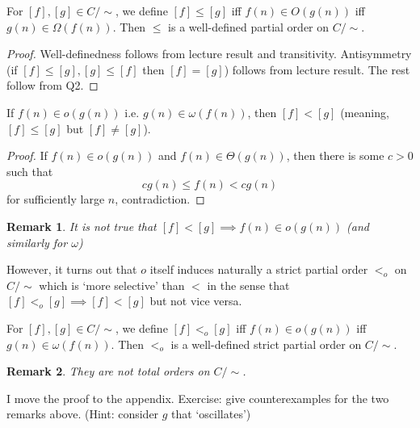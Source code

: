 \documentclass[t]{beamer}
\newtheorem{remark}{Remark}
\def\le{\leqslant}
\begin{document}
\begin{frame}
  \begin{theorem}
    For $[f], [g] \in C/{\sim}$, we define $[f] \le [g]$ iff $f(n) \in O(g(n))$ iff $g(n) \in \Omega(f(n))$. Then $\le$ is a well-defined partial order on $C/{\sim}$. %
  \end{theorem}
  \begin{proof}
    Well-definedness follows from lecture result and transitivity. Antisymmetry (if $[f]\le[g], [g]\le[f]$ then $[f]=[g]$) follows from lecture result. The rest follow from Q2.%
  \end{proof}
  \begin{theorem}
    If $f(n) \in o(g(n))$ i.e. $g(n) \in \omega(f(n))$, then $[f]<[g]$ (meaning, $[f] \le [g]$ but $[f] \ne [g]$).
  \end{theorem}
  \begin{proof}
    If $f(n) \in o(g(n))$ and $f(n) \in \Theta(g(n))$, then there is some $c>0$ such that 
    \[cg(n) \le f(n) < cg(n)\]
    for sufficiently large $n$, contradiction.
  \end{proof}
\end{frame}
\begin{frame}
  \begin{remark}
    \alert{It is not true that $[f]<[g] \implies f(n) \in o(g(n))$ (and similarly for $\omega$)}
  \end{remark}
  However, it turns out that $o$ itself induces naturally a strict partial order $<_o$ on $C/{\sim}$ which is `more selective' than $<$ in the sense that $[f]<_o[g] \implies [f]<[g]$ but not vice versa. 
  \begin{theorem}
    For $[f], [g] \in C/{\sim}$, we define $[f] <_o [g]$ iff $f(n) \in o(g(n))$ iff $g(n) \in \omega(f(n))$. Then $<_o$ is a well-defined strict partial order on $C/{\sim}$. 
  \end{theorem}
  \begin{remark}
    \alert{They are not total orders on $C/{\sim}$}. 
  \end{remark}
  I move the proof to the appendix. Exercise: give counterexamples for the two remarks above. (Hint: consider $g$ that `oscillates')
\end{frame}
\end{document}
